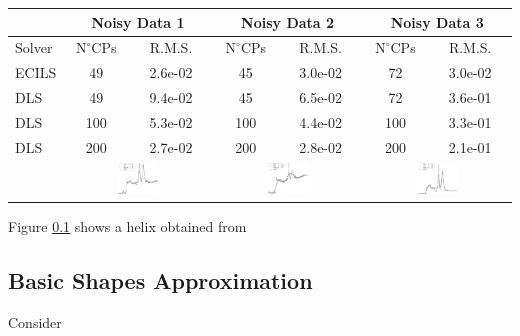  
 
 
 \begin{table}
  \begin{tabular}{|l |cc |cc| cc|}
  \hline
  &\multicolumn{2}{c|}{{Noisy Data 1}}&\multicolumn{2}{c|}{{Noisy Data 2}}&\multicolumn{2}{c|}{{Noisy Data 3}}\\
  \hline
Solver& $\text{N}^\circ $CPs&R.M.S.&$\text{N}^\circ $CPs&R.M.S.&$\text{N}^\circ $CPs&R.M.S.\\   
\hline
ECILS & 49  & 2.6e-02	& 45  &	3.0e-02	& 72  &	3.0e-02\\
\hline
DLS   & 49  & 9.4e-02	& 45  &	6.5e-02	& 72  &	3.6e-01\\
DLS   & 100 & 5.3e-02	& 100 &	4.4e-02	& 100 &	3.3e-01\\
DLS   & 200 & 2.7e-02	& 200 &	2.8e-02	& 200 &	2.1e-01\\
\hline
&\multicolumn{2}{c|}{\includegraphics[width=0.29\textwidth]{noise1}}
 &\multicolumn{2}{c|}{\includegraphics[width=0.29\textwidth]{noise2}}
 &\multicolumn{2}{c|}{\includegraphics[width=0.29\textwidth]{noise3}}\\
\hline
  \end{tabular}

 \end{table}



 
 Figure \ref{} shows a helix obtained from \subsection{Basic Shapes Approximation}
 Consider
 
 



   
